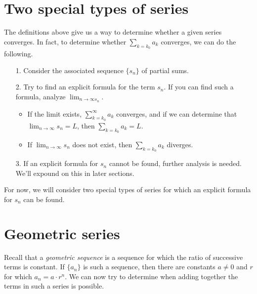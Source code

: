 \documentclass{ximera}
\begin{document}
%
%

\section{Two special types of series}
The definitions above give us a way to determine whether a given series converges.  In fact, to determine whether $\sum_{k=k_0} a_k$ converges, we can do the following.

\begin{itemize}
\item[1.] Consider the associated sequence $\{s_n\}$ of partial sums.
\item[2.] Try to find an explicit formula for the term $s_n$.  If you can find such a formula, analyze $\lim_{n \to \infty s_n}$.  
\begin{itemize}
\item If the limit exists, $\sum_{k=k_0}^{\infty} a_k$ converges, and if we can determine that $\lim_{n \to \infty} s_n =L$, then $\sum_{k=k_0} a_k=L$.  \item If  $\lim_{n \to \infty} s_n$ does not exist, then $\sum_{k=k_0} a_k$ diverges.
\end{itemize}
\item[3.] If an explicit formula for $s_n$ cannot be found, further analysis is needed.  We'll expound on this in later sections.
\end{itemize}

For now, we will consider two special types of series for which an explicit formula for $s_n$ can be found.

\section{Geometric series}
Recall that a \emph{geometric sequence} is a sequence for which the ratio of successive terms is constant.  If $\{a_n\}$ is such a sequence, then there are constants $a \ne 0$ and $r$ for which $a_n = a\cdot r^n$.  We can now try to determine when adding together the terms in such a series is possible.
\end{document}
